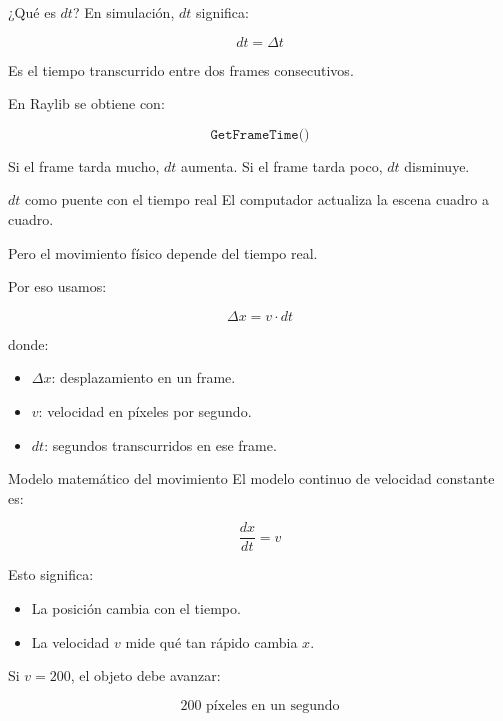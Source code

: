 \documentclass{beamer}
\begin{document}
\begin{frame}{¿Qué es \(dt\)?}
En simulación, \(dt\) significa:

\[
dt = \Delta t
\]

Es el tiempo transcurrido entre dos frames consecutivos.

\medskip

En Raylib se obtiene con:

\[
\texttt{GetFrameTime()}
\]

\medskip

Si el frame tarda mucho, \(dt\) aumenta.  
Si el frame tarda poco, \(dt\) disminuye.
\end{frame}

\begin{frame}{\(dt\) como puente con el tiempo real}
El computador actualiza la escena cuadro a cuadro.

\medskip

Pero el movimiento físico depende del tiempo real.

\medskip

Por eso usamos:

\[
\Delta x = v \cdot dt
\]

donde:

\begin{itemize}
    \item \(\Delta x\): desplazamiento en un frame.
    \item \(v\): velocidad en píxeles por segundo.
    \item \(dt\): segundos transcurridos en ese frame.
\end{itemize}
\end{frame}

\begin{frame}{Modelo matemático del movimiento}
El modelo continuo de velocidad constante es:

\[
\frac{dx}{dt} = v
\]

Esto significa:

\begin{itemize}
    \item La posición cambia con el tiempo.
    \item La velocidad \(v\) mide qué tan rápido cambia \(x\).
\end{itemize}

Si \(v=200\), el objeto debe avanzar:

\[
200 \text{ píxeles en un segundo}
\]
\end{frame}
\end{document}
